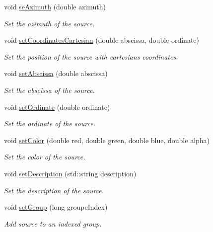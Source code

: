 \begin{DoxyCompactItemize}
void \hyperlink{class_hoa2_d_1_1_source_a255adb726b06ce0a4f639e538dd0d35e}{se\-Azimuth} (double azimuth)
\begin{DoxyCompactList}\small\item\em Set the azimuth of the source. \end{DoxyCompactList}\item 
void \hyperlink{class_hoa2_d_1_1_source_a6b618e9a6be2cdc899c89c4b877f9445}{set\-Coordinates\-Cartesian} (double abscissa, double ordinate)
\begin{DoxyCompactList}\small\item\em Set the position of the source with cartesians coordinates. \end{DoxyCompactList}\item 
void \hyperlink{class_hoa2_d_1_1_source_a5df6e0311e53adf82395883f30b84540}{set\-Abscissa} (double abscissa)
\begin{DoxyCompactList}\small\item\em Set the abscissa of the source. \end{DoxyCompactList}\item 
void \hyperlink{class_hoa2_d_1_1_source_a2674f583f6d857672449b1509efb453f}{set\-Ordinate} (double ordinate)
\begin{DoxyCompactList}\small\item\em Set the ordinate of the source. \end{DoxyCompactList}\item 
void \hyperlink{class_hoa2_d_1_1_source_ab88a3aed83fc470d7411f008ae6fd7b6}{set\-Color} (double red, double green, double blue, double alpha)
\begin{DoxyCompactList}\small\item\em Set the color of the source. \end{DoxyCompactList}\item 
void \hyperlink{class_hoa2_d_1_1_source_a104f8e689d537bd1063e6dd870261be6}{set\-Description} (std\-::string description)
\begin{DoxyCompactList}\small\item\em Set the description of the source. \end{DoxyCompactList}\item 
void \hyperlink{class_hoa2_d_1_1_source_aa98097a6c37727cb77303e079879c711}{set\-Group} (long groupe\-Index)
\begin{DoxyCompactList}\small\item\em Add source to an indexed group. \end{DoxyCompactList}\item 

\end{DoxyCompactItemize}
